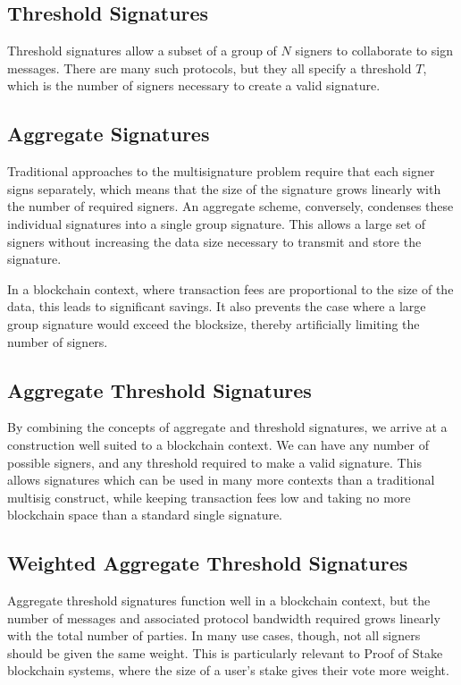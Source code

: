 \documentclass{article}
\begin{document}
\subsection{
  Threshold Signatures
}

Threshold signatures allow a subset of a group of $N$ signers to collaborate to sign messages.  There are many such protocols, but they all specify a threshold $T$, which is the number of signers necessary to create a valid signature.  

\subsection{
  Aggregate Signatures
}

Traditional approaches to the multisignature problem require that each signer signs separately, which means that the size of the signature grows linearly with the number of required signers.  An aggregate scheme, conversely, condenses these individual signatures into a single group signature.  This allows a large set of signers without increasing the data size necessary to transmit and store the signature.

In a blockchain context, where transaction fees are proportional to the size of the data, this leads to significant savings.  It also prevents the case where a large group signature would exceed the blocksize, thereby artificially limiting the number of signers.

\subsection{
  Aggregate Threshold Signatures
}

By combining the concepts of aggregate and threshold signatures, we arrive at a construction well suited to a blockchain context.  We can have any number of possible signers, and any threshold required to make a valid signature.  This allows signatures which can be used in many more contexts than a traditional multisig construct, while keeping transaction fees low and taking no more blockchain space than a standard single signature.

\subsection{
  Weighted Aggregate Threshold Signatures
}

Aggregate threshold signatures function well in a blockchain context, but the number of messages and associated protocol bandwidth required grows linearly with the total number of parties.  In many use cases, though, not all signers should be given the same weight.  This is particularly relevant to Proof of Stake blockchain systems, where the size of a user's stake gives their vote more weight.
\end{document}
